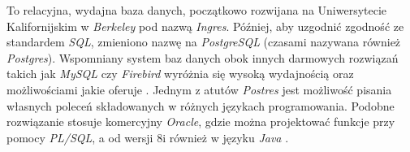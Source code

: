 To relacyjna, wydajna baza danych, początkowo rozwijana na Uniwersytecie Kalifornijskim w \emph{Berkeley} pod nazwą \emph{Ingres}. Później, aby uzgodnić zgodność ze standardem \emph{SQL}, zmieniono nazwę na \emph{PostgreSQL} (czasami nazywana również \emph{Postgres}). Wspomniany system baz danych obok innych darmowych rozwiązań takich jak \emph{MySQL} czy \emph{Firebird} wyróżnia się wysoką wydajnością oraz możliwościami jakie oferuje \cite[s.\pageref{sec:referencje}]{mysql,firebird}. Jednym z atutów \emph{Postres} jest możliwość pisania własnych poleceń składowanych w różnych językach programowania. Podobne rozwiązanie stosuje komercyjny \emph{Oracle}, gdzie można projektować funkcje przy pomocy \emph{PL/SQL}, a od wersji 8i również w języku \emph{Java} \cite[s.\pageref{sec:referencje}]{oracle}.